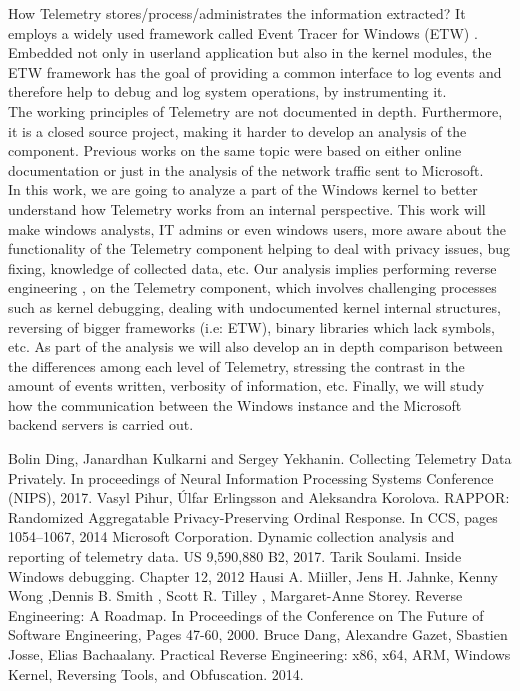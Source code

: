 \documentclass{article}
\begin{document}
How Telemetry stores/process/administrates the information extracted? It employs a widely used framework called Event Tracer for Windows (ETW) \cite{4}. Embedded not only in userland application but also in the kernel modules, the ETW framework has the goal of providing a common interface to log events and therefore help to debug and log system operations, by instrumenting it.\\

The working principles of Telemetry are not documented in depth. Furthermore, it is a closed source project, making it harder to develop an analysis of the component. Previous works on the same topic were based on either online documentation or just in the analysis of the network traffic sent to Microsoft.\\


In this work, we are going to analyze a part of the Windows kernel to better understand how Telemetry works from an internal perspective. This work will make windows analysts, IT admins or even windows users, more aware about the functionality of the Telemetry component helping to deal with privacy issues, bug fixing, knowledge of collected data, etc. Our analysis implies performing reverse engineering \cite{5},\cite{6} on the Telemetry component, which involves challenging processes such as kernel debugging, dealing with undocumented kernel internal structures, reversing of bigger frameworks (i.e: ETW), binary libraries which lack symbols, etc.
As part of the analysis we will also develop an in depth comparison between the differences among each level of Telemetry, stressing the contrast in the amount of events written, verbosity of information, etc. Finally, we will study how the communication between the Windows instance and the Microsoft backend servers is carried out.


\begin{thebibliography}{6}
 Bolin Ding, Janardhan Kulkarni and Sergey Yekhanin. Collecting Telemetry Data Privately. In proceedings of Neural Information Processing Systems Conference (NIPS),  2017.
 Vasyl Pihur, Úlfar Erlingsson and Aleksandra Korolova. RAPPOR: Randomized Aggregatable Privacy-Preserving Ordinal Response. In CCS, pages 1054–1067, 2014
 Microsoft Corporation. Dynamic collection analysis and reporting of telemetry data. US 9,590,880 B2, 2017.
 Tarik Soulami. Inside Windows debugging. Chapter 12, 2012
 Hausi A. Miiller, Jens H. Jahnke, Kenny Wong ,Dennis B. Smith , Scott R. Tilley , Margaret-Anne Storey. Reverse Engineering: A Roadmap. In Proceedings of the Conference on The Future of Software Engineering, Pages 47-60, 2000.
 Bruce Dang,  Alexandre Gazet, Sbastien Josse,  Elias Bachaalany. Practical Reverse Engineering: x86, x64, ARM, Windows Kernel, Reversing Tools, and Obfuscation. 2014.
\end{thebibliography}
\end{document}
